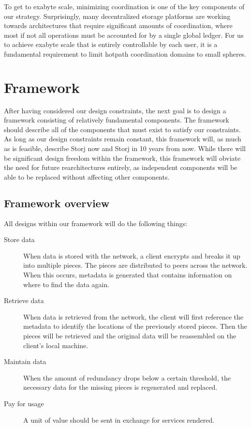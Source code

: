 \documentclass[8pt,fleqn,openany]{book}
\begin{document}
To get to exabyte scale, minimizing coordination is one of the key components
of our strategy.
Surprisingly, many decentralized storage platforms are working towards
architectures that require significant amounts of coordination,
where most if not all operations must be accounted for by a single global
ledger. For us to achieve exabyte scale that is entirely controllable by each user, it is a fundamental requirement to limit hotpath coordination domains to small spheres.

\chapter{Framework}\label{chap:framework}

After having considered our design constraints, the next goal is to design
a framework consisting of relatively fundamental components.
The framework should describe
all of the components that must exist to satisfy our constraints.
As long as our design constraints remain constant, this framework will, as
much as is feasible, describe Storj now and Storj in 10 years from now.
While there will be significant design freedom within the framework,
this framework will obviate the need for future rearchitectures entirely, as
independent components will be able to be replaced without affecting other
components.

\section{Framework overview}

All designs within our framework will do the following things:

\begin{description}

\item[Store data] When data is stored with the network, a client encrypts
and breaks it up into multiple pieces. The pieces are distributed
to peers across the network. When this occurs, metadata is generated that
contains information on where to find the data again.

\item[Retrieve data] When data is retrieved from the network,
the client will first reference the metadata to identify the locations of the
previously stored pieces.
Then the pieces will be retrieved and the original data will be reassembled
on the client's local machine.

\item[Maintain data] When the amount of redundancy drops below a certain
threshold, the necessary data for the missing pieces is regenerated and
replaced.

\item[Pay for usage] A unit of value should be sent in exchange for
services rendered.

\end{description}
\end{document}
